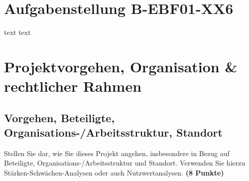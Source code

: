 \documentclass[
%
ngerman %
%
numeric %
]{wbh-assignment}
\begin{document}

\onehalfspacing
{}
\tableofcontents %
\cleardoublepage


\renewcommand{\sectionmark}[1]{\markright{#1}}
\renewcommand{\subsectionmark}[1]{}
\renewcommand{\subsubsectionmark}[1]{}

\onehalfspacing
\renewcommand{\thesection}{\arabic{section}}
\renewcommand{\theHsection}{\arabic{section}}
\setcounter{section}{0}

\section*{Aufgabenstellung B-EBF01-XX6}
text
\cleardoublepage
text
\cleardoublepage

\section{Projektvorgehen, Organisation \& rechtlicher Rahmen}
\label{sec:projektvorgehen}

\subsection{Vorgehen, Beteiligte, Organisations-/Arbeitsstruktur, Standort}
\begin{aufgabenstellung}
Stellen Sie dar, wie Sie dieses Projekt angehen, insbesondere in Bezug auf Beteiligte, Organisations-/Arbeitsstruktur und Standort. Verwenden Sie hierzu Stärken-Schwächen-Analysen oder auch Nutzwertanalysen. \textbf{(8 Punkte)}
\end{aufgabenstellung}
\end{document}
